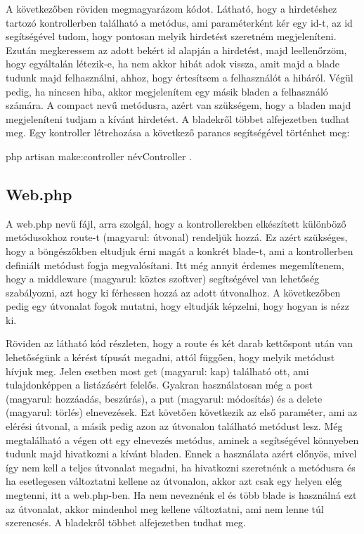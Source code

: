\documentclass[]{thesis-ekf}
\theoremstyle{definition}
\theoremstyle{remark}
\begin{document}
			A következőben röviden megmagyarázom  kódot. Látható, hogy a hirdetéshez tartozó kontrollerben található a metódus, ami paraméterként kér egy id-t, az id segítségével tudom, hogy pontosan melyik hirdetést szeretném megjeleníteni. Ezután megkeressem az adott bekért id alapján a hirdetést, majd leellenőrzöm, hogy egyáltalán létezik-e, ha nem akkor hibát adok vissza, amit majd a blade tudunk majd felhasználni, ahhoz, hogy értesítsem a felhasználót a hibáról. Végül pedig, ha nincsen hiba, akkor megjelenítem egy másik bladen a felhasználó számára. A compact nevű metódusra, azért van szükségem, hogy a bladen majd megjeleníteni tudjam a kívánt hirdetést. A bladekről többet  alfejezetben tudhat meg.  Egy kontroller létrehozása a következő parancs segítségével történhet meg:
		\begin{center} 
			php artisan make:controller névController .
		\end{center}
		  
	\subsection{Web.php}
		A web.php nevű fájl, arra szolgál, hogy a kontrollerekben elkészített különböző metódusokhoz route-t (magyarul: útvonal) rendeljük hozzá. Ez azért szükséges, hogy a böngészőkben eltudjuk érni magát a konkrét blade-t, ami a kontrollerben definiált metódust fogja megvalósítani. Itt még annyit érdemes megemlítenem, hogy a middleware (magyarul: köztes szoftver) segítségével van lehetőség szabályozni, azt hogy ki férhessen hozzá az adott útvonalhoz. A következőben pedig egy útvonalat fogok mutatni, hogy eltudják képzelni, hogy hogyan is nézz ki.
	
		
	
		Röviden az látható  kód részleten, hogy a route és két darab kettőspont után van lehetőségünk a kérést típusát megadni, attól függően, hogy melyik metódust hívjuk meg. Jelen esetben most get (magyarul: kap) található ott, ami tulajdonképpen a listázásért felelős. Gyakran használatosan még a post (magyarul: hozzáadás, beszúrás), a put (magyarul: módosítás) és a delete (magyarul: törlés) elnevezések. Ezt követően következik az első paraméter, ami az elérési útvonal, a másik pedig azon az útvonalon található metódust lesz. Még megtalálható a végen ott egy elnevezés metódus, aminek a segítségével könnyeben tudunk majd hivatkozni a kívánt bladen. Ennek a használata azért előnyös, mivel így nem kell a teljes útvonalat megadni, ha hivatkozni szeretnénk a metódusra és ha esetlegesen változtatni kellene az útvonalon, akkor azt csak egy helyen elég megtenni, itt a web.php-ben. Ha nem neveznénk el és több blade is használná ezt az útvonalat, akkor mindenhol meg kellene változtatni, ami nem lenne túl szerencsés. A bladekről többet  alfejezetben tudhat meg.
	
\end{document}
